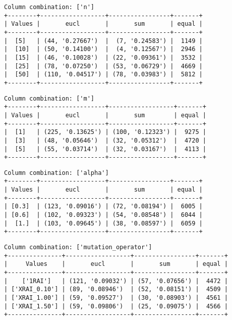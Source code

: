 \documentclass{article}
\begin{document}
\begin{verbatim}
Column combination: ['n']
+--------+------------------+-----------------+-------+
| Values |       eucl       |       sum       | equal |
+--------+------------------+-----------------+-------+
|  [5]   | (44, '0.27667')  |  (7, '0.24583') |  1149 |
|  [10]  | (50, '0.14100')  |  (4, '0.12567') |  2946 |
|  [15]  | (46, '0.10028')  | (22, '0.09361') |  3532 |
|  [25]  | (78, '0.07250')  | (53, '0.06729') |  4669 |
|  [50]  | (110, '0.04517') | (78, '0.03983') |  5812 |
+--------+------------------+-----------------+-------+
\end{verbatim}

\begin{verbatim}
Column combination: ['m']
+--------+------------------+------------------+-------+
| Values |       eucl       |       sum        | equal |
+--------+------------------+------------------+-------+
|  [1]   | (225, '0.13625') | (100, '0.12323') |  9275 |
|  [3]   | (48, '0.05646')  | (32, '0.05312')  |  4720 |
|  [5]   | (55, '0.03714')  | (32, '0.03167')  |  4113 |
+--------+------------------+------------------+-------+
\end{verbatim}

\begin{verbatim}
Column combination: ['alpha']
+--------+------------------+-----------------+-------+
| Values |       eucl       |       sum       | equal |
+--------+------------------+-----------------+-------+
| [0.3]  | (123, '0.09016') | (72, '0.08194') |  6005 |
| [0.6]  | (102, '0.09323') | (54, '0.08548') |  6044 |
|  [1.]  | (103, '0.09645') | (38, '0.08597') |  6059 |
+--------+------------------+-----------------+-------+
\end{verbatim}

\begin{verbatim}
Column combination: ['mutation_operator']
+---------------+------------------+-----------------+-------+
|     Values    |       eucl       |       sum       | equal |
+---------------+------------------+-----------------+-------+
|    ['1RAI']   | (121, '0.09032') | (57, '0.07656') |  4472 |
| ['XRAI_0.10'] | (89, '0.08946')  | (52, '0.08151') |  4509 |
| ['XRAI_1.00'] | (59, '0.09527')  | (30, '0.08903') |  4561 |
| ['XRAI_1.50'] | (59, '0.09806')  | (25, '0.09075') |  4566 |
+---------------+------------------+-----------------+-------+
\end{verbatim}
\end{document}
